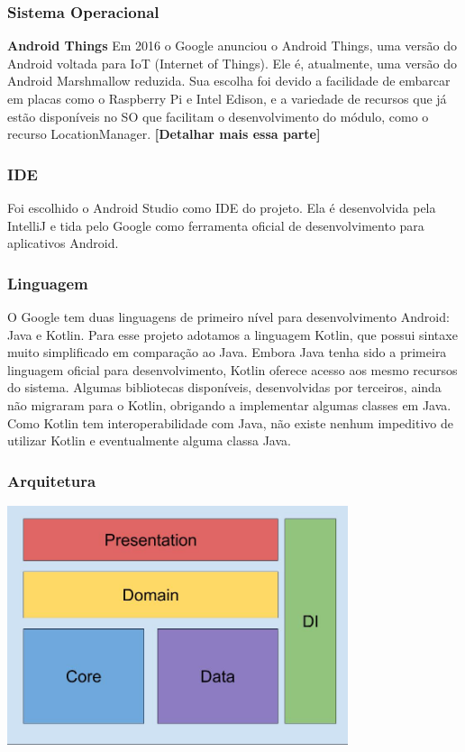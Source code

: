 \documentclass[
	12pt,				%
	oneside,			%
	a4paper,			%
	brazil				%
]{abntex2}
\begin{document}
\subsubsection{Sistema Operacional}

\textbf{Android Things}
Em 2016 o Google anunciou o Android Things, uma versão do Android voltada para IoT (Internet of Things). Ele é, atualmente, uma versão do Android Marshmallow reduzida. Sua escolha foi devido a facilidade de embarcar em placas como o Raspberry Pi e Intel Edison, e a variedade de recursos que já estão disponíveis no SO que facilitam o desenvolvimento do módulo, como o recurso LocationManager. \textbf{[Detalhar mais essa parte]}

\subsubsection{IDE}

Foi escolhido o Android Studio como IDE do projeto. Ela é desenvolvida pela IntelliJ e tida pelo Google como ferramenta oficial de desenvolvimento para aplicativos Android.

\subsubsection{Linguagem}

O Google tem duas linguagens de primeiro nível para desenvolvimento Android: Java e Kotlin. Para esse projeto adotamos a linguagem Kotlin, que possui sintaxe muito simplificado em comparação ao Java. Embora Java tenha sido a primeira linguagem oficial para desenvolvimento, Kotlin oferece acesso aos mesmo recursos do sistema.
Algumas bibliotecas disponíveis, desenvolvidas por terceiros, ainda não migraram para o Kotlin, obrigando a implementar algumas classes em Java. Como Kotlin tem interoperabilidade com Java, não existe nenhum impeditivo de utilizar Kotlin e eventualmente alguma classa Java.

\subsubsection{Arquitetura}

\includegraphics[width=10cm, center]{images/brick_diagram_bus_tracker}
\end{document}
